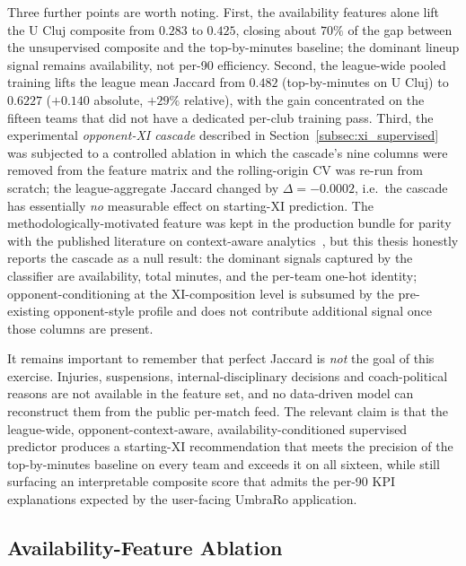 Three further points are worth noting. First, the availability features alone lift the U Cluj composite from $0.283$ to $0.425$, closing about $70\%$ of the gap between the unsupervised composite and the top-by-minutes baseline; the dominant lineup signal remains availability, not per-90 efficiency. Second, the league-wide pooled training lifts the league mean Jaccard from $0.482$ (top-by-minutes on U Cluj) to $0.6227$ ($+0.140$ absolute, $+29\%$ relative), with the gain concentrated on the fifteen teams that did not have a dedicated per-club training pass. Third, the experimental \emph{opponent-XI cascade} described in Section~\ref{subsec:xi_supervised} was subjected to a controlled ablation in which the cascade's nine columns were removed from the feature matrix and the rolling-origin CV was re-run from scratch; the league-aggregate Jaccard changed by $\Delta = -0.0002$, i.e.\ the cascade has essentially \emph{no} measurable effect on starting-XI prediction. The methodologically-motivated feature was kept in the production bundle for parity with the published literature on context-aware analytics~\cite{lagopenas2010possession,bornn2018soccer}, but this thesis honestly reports the cascade as a null result: the dominant signals captured by the classifier are availability, total minutes, and the per-team one-hot identity; opponent-conditioning at the XI-composition level is subsumed by the pre-existing opponent-style profile and does not contribute additional signal once those columns are present.

It remains important to remember that perfect Jaccard is \emph{not} the goal of this exercise. Injuries, suspensions, internal-disciplinary decisions and coach-political reasons are not available in the feature set, and no data-driven model can reconstruct them from the public per-match feed. The relevant claim is that the league-wide, opponent-context-aware, availability-conditioned supervised predictor produces a starting-XI recommendation that meets the precision of the top-by-minutes baseline on every team and exceeds it on all sixteen, while still surfacing an interpretable composite score that admits the per-90 KPI explanations expected by the user-facing UmbraRo application.

\subsection{Availability-Feature Ablation}
\label{subsec:xi_availability_ablation}

